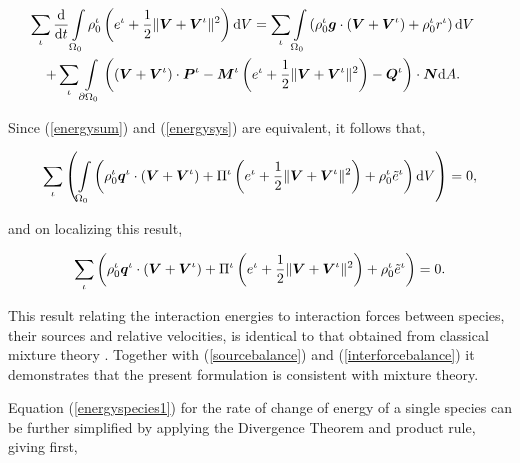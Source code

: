 \begin{eqnarray}
\sum\limits_{\iota}\frac{\mathrm{d}}{\mathrm{d}t}
\int\limits_{\Omega_0}\rho_0^\iota \left ( e^\iota + \frac{1}{2}
\Vert\mbox{\boldmath$ V$}+\mbox{\boldmath$ V$}^\iota\Vert^2 \right ) \mathrm{d}V =
\sum\limits_{\iota}\int\limits_{\Omega_0} \left(\rho_0^\iota\mbox{\boldmath$ g$}
\cdot\left(\mbox{\boldmath$ V$}+\mbox{\boldmath$ V$}^\iota\right) + \rho_0^\iota r^\iota
\right)\mathrm{d}V &
&\nonumber\\
+\sum\limits_{\iota}\int\limits_{\partial
\Omega_0}\left(\left(\mbox{\boldmath$ V$}+\mbox{\boldmath$ V$}^\iota\right)\cdot\mbox{\boldmath$ P$}^\iota -
\mbox{\boldmath$ M$}^\iota\left(e^\iota +\frac{1}{2}
\Vert\mbox{\boldmath$ V$}+\mbox{\boldmath$ V$}^\iota\Vert^2\right) -
\mbox{\boldmath$ Q$}^\iota\right)\cdot\mbox{\boldmath$ N$}\mathrm{d}A.\quad& & \label{energysys}
\end{eqnarray}

Since (\ref{energysum}) and (\ref{energysys}) are equivalent, it
follows that,

\begin{eqnarray}
\sum\limits_{\iota}\left(\int\limits_{\Omega_0}\left(\rho_0^\iota\mbox{\boldmath$ q$}^\iota\cdot(\mbox{\boldmath$ V$}+\mbox{\boldmath$ V$}^\iota)
+ \Pi^\iota\left(e^\iota +
\frac{1}{2}\Vert\mbox{\boldmath$ V$}+\mbox{\boldmath$ V$}^\iota\Vert^2\right)+\rho^\iota_0\tilde{e}^\iota\right)\mathrm{d}V
\right)= 0,
\end{eqnarray}

\noindent and on localizing this result,

\begin{eqnarray}
\sum\limits_{\iota}\left(\rho_0^\iota\mbox{\boldmath$ q$}^\iota\cdot(\mbox{\boldmath$ V$}+\mbox{\boldmath$ V$}^\iota)
+ \Pi^\iota\left(e^\iota +
\frac{1}{2}\Vert\mbox{\boldmath$ V$}+\mbox{\boldmath$ V$}^\iota\Vert^2\right)+\rho^\iota_0\tilde{e}^\iota\right)=
0. \label{energycond1}
\end{eqnarray}

\noindent This result relating the interaction energies to
interaction forces between species, their sources and relative
velocities, is identical to that obtained from classical mixture
theory \citep{TruesdellNoll:65}. Together with
(\ref{sourcebalance}) and (\ref{interforcebalance}) it
demonstrates that the present formulation is consistent with
mixture theory.

Equation (\ref{energyspecies1}) for the rate of change of energy
of a single species can be further simplified by applying the
Divergence Theorem and product rule, giving first,

